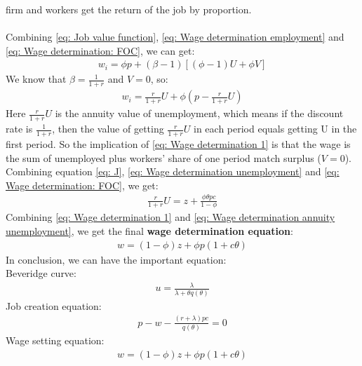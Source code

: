 \documentclass{article}
\begin{document}
firm and workers get the return of the job by proportion.\\\\
Combining \eqref{eq: Job value function}, \eqref{eq: Wage determination employment} and \eqref{eq: Wage determination: FOC}, we can get:
\begin{align*}
	w_i = \phi p + (\beta - 1)[(\phi - 1) U + \phi V]
\end{align*}
We know that $\beta = \frac{1}{1 + r}$ and $V = 0$, so:
\begin{align}
	w_i = \frac{r}{1 + r}U + \phi (p - \frac{r}{1 + r} U) \label{eq: Wage determination 1}
\end{align}Here $\frac{r}{1 + r}U$ is the annuity value of unemployment, which means if the discount rate is $\frac{1}{1 + r}$, then the value of getting $\frac{r}{1 + r}U$ in each period equals getting U in the first period. So the implication of \eqref{eq: Wage determination 1} is that the wage is the sum of unemployed plus workers' share of one period match surplus ($V = 0$).\\
Combining equation \eqref{eq: J}, \eqref{eq: Wage determination unemployment} and \eqref{eq: Wage determination: FOC}, we get:
\begin{align}
	\frac{r}{1 + r} U = z + \frac{\phi \theta pc}{1 - \phi} \label{eq: Wage determination annuity unemployment}
\end{align}
Combining \eqref{eq: Wage determination 1} and \eqref{eq: Wage determination annuity unemployment}, we get the final \textbf{wage determination equation}:
\begin{align}
	w = (1 - \phi)z + \phi p(1 + c\theta) \label{eq: Wage determination}
\end{align}
In conclusion, we can have the important equation:\\
\indent Beveridge curve:
\begin{align*}
	u = \frac{\lambda}{\lambda + \theta q(\theta)}
\end{align*}
\indent Job creation equation:
\begin{align*}
	p - w - \frac{(r + \lambda)pc}{q(\theta)} = 0
\end{align*}
\indent Wage setting equation:
\begin{align*}
	w = (1 - \phi)z + \phi p(1 + c\theta) 
\end{align*}
\end{document}
